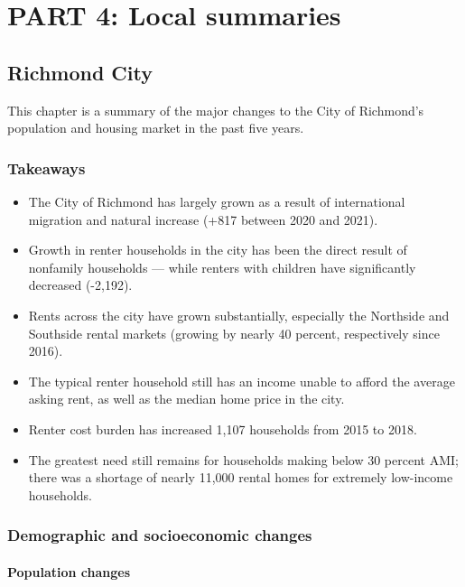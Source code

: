\documentclass[
  letterpaper,
  DIV=11,
  numbers=noendperiod]{scrreprt}
\providecommand{\tightlist}{%
  \setlength{\itemsep}{0pt}\setlength{\parskip}{0pt}}\usepackage{longtable,booktabs,array}
\begin{document}
\part{PART 4: Local summaries}

\hypertarget{part-4-1}{%
\chapter{Richmond City}\label{part-4-1}}

This chapter is a summary of the major changes to the City of Richmond's
population and housing market in the past five years.

\hypertarget{takeaways}{%
\section{Takeaways}\label{takeaways}}

\begin{itemize}
\tightlist
\item
  The City of Richmond has largely grown as a result of international
  migration and natural increase (+817 between 2020 and 2021).
\item
  Growth in renter households in the city has been the direct result of
  nonfamily households --- while renters with children have
  significantly decreased (-2,192).
\item
  Rents across the city have grown substantially, especially the
  Northside and Southside rental markets (growing by nearly 40 percent,
  respectively since 2016).
\item
  The typical renter household still has an income unable to afford the
  average asking rent, as well as the median home price in the city.
\item
  Renter cost burden has increased 1,107 households from 2015 to 2018.
\item
  The greatest need still remains for households making below 30 percent
  AMI; there was a shortage of nearly 11,000 rental homes for extremely
  low-income households.
\end{itemize}

\hypertarget{demographic-and-socioeconomic-changes}{%
\section{Demographic and socioeconomic
changes}\label{demographic-and-socioeconomic-changes}}

\hypertarget{population-changes}{%
\subsection{Population changes}\label{population-changes}}
\end{document}
